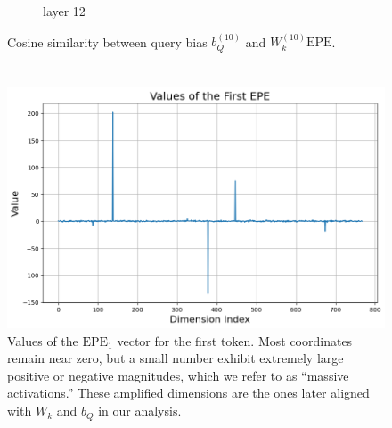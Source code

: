 \documentclass[11pt]{article}
\begin{document}
\begin{figure}[t]
\begin{subfigure}[t]{0.24\textwidth}
    \caption{layer 12}
  \end{subfigure}\hfill
    \vspace{2mm}

  \caption{Cosine similarity between query bias $b_Q^{(10)}$ and $W_k^{(10)}\mathrm{EPE}$.}
\end{figure}

\section{}\label{app:massive_activations_in_ppe}

\begin{figure}[t]
  \includegraphics[width=\columnwidth]{figures/massive_activations_in_ppe.png}
  \caption{Values of the $\mathrm{EPE}_1$ vector for the first token. Most coordinates remain near zero, but a small number exhibit extremely large positive or negative magnitudes, which we refer to as ``massive activations.'' These amplified dimensions are the ones later aligned with $W_k$ and $b_Q$ in our analysis.}
\end{figure}
\end{document}
